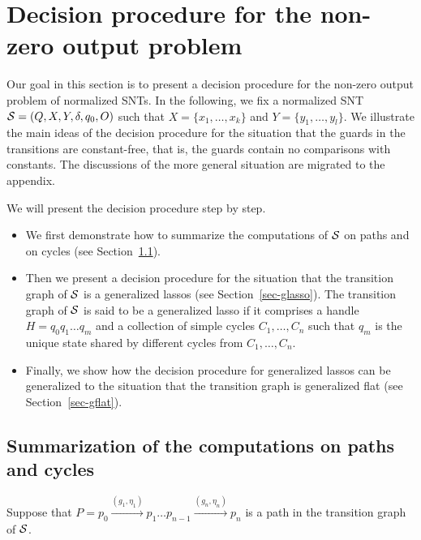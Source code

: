 
\section{Decision procedure for the non-zero output problem}\label{sec:dec-snt}

Our goal in this section is to present a decision procedure for the non-zero output problem of normalized SNTs.  In the following, we fix a normalized SNT ${\mathcal{S} } = (Q,X,Y,\delta,q_0,O)$ such that $X=\{ x_1,\dots, x_k\}$ and $Y = \{y_1,\dots,y_l\}$. We illustrate the main ideas of the decision procedure for the situation that the guards in the transitions are constant-free, that is, the guards contain no comparisons with constants. The discussions of the more general situation are migrated to the appendix. 

We will present the decision procedure step by step.
\begin{itemize}
\item We first demonstrate how to summarize the computations of ${\mathcal{S} }$ on paths and on cycles (see Section~\ref{sec-sum}). 
%
\item Then we present a decision procedure for the situation that the transition graph of ${\mathcal{S} }$ is a generalized lassos (see Section~\ref{sec-glasso}). The transition graph of ${\mathcal{S} }$ is said to be a generalized lasso if it comprises a handle $H=q_0 q_1 \dots q_m$ and a collection of simple cycles $C_1,\dots,C_n$ such that $q_m$ is the unique state shared by different cycles from $C_1,\dots,C_n$. 
%
\item Finally, we show how the decision procedure for generalized lassos can be generalized to the situation that the transition graph is generalized flat (see Section~\ref{sec-gflat}).
\end{itemize}




\subsection{Summarization of the computations on paths and cycles}\label{sec-sum}

Suppose that $P=p_0 \xrightarrow{(g_1,\eta_1)} p_1 \dots p_{n-1} \xrightarrow{(g_n,\eta_n)} p_{n}$ is a path in the transition graph of ${\mathcal{S} }$. 



